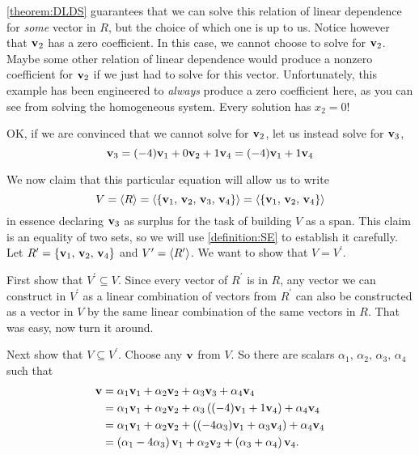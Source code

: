 \documentclass{ximera}
\begin{document}
\begin{example}
  \ref{theorem:DLDS} guarantees that we can solve this relation of
  linear dependence for \textit{some} vector in $R$, but the choice of
  which one is up to us.  Notice however that $\mathbf{v}_2$ has a zero
  coefficient.  In this case, we cannot choose to solve for
  $\mathbf{v}_2$.  Maybe some other relation of linear dependence would
  produce a nonzero coefficient for $\mathbf{v}_2$ if we just had to
  solve for this vector.  Unfortunately, this example has been
  engineered to \textit{always} produce a zero coefficient here, as
  you can see from solving the homogeneous system.  Every solution has
  $x_2=0$!

  OK, if we are convinced that we cannot solve for $\mathbf{v}_2$, let
  us instead solve for $\mathbf{v}_3$,
  \[
    \mathbf{v}_3=(-4)\mathbf{v}_1+0\mathbf{v}_2+1\mathbf{v}_4=(-4)\mathbf{v}_1+1\mathbf{v}_4
  \]
  
  We now claim that this particular equation will allow us to write
  \[
    V=\left\langle R\right\rangle=
    \left\langle\left\{\mathbf{v}_1,\,\mathbf{v}_2,\,\mathbf{v}_3,\,\mathbf{v}_4\right\}\right\rangle=
    \left\langle\left\{\mathbf{v}_1,\,\mathbf{v}_2,\,\mathbf{v}_4\right\}\right\rangle
  \]
  in essence declaring $\mathbf{v}_3$ as surplus for the task of
  building $V$ as a span.  This claim is an equality of two sets, so
  we will use \ref{definition:SE} to establish it carefully.  Let
  $R^\prime=\left\{\mathbf{v}_1,\,\mathbf{v}_2,\,\mathbf{v}_4\right\}$ and
  $V^\prime=\left\langle R^\prime\right\rangle$.  We want to show that $V=V^\prime$.

  First show that $V^\prime\subseteq V$.  Since every vector of
  $R^\prime$ is in $R$, any vector we can construct in $V^\prime$ as a
  linear combination of vectors from $R^\prime$ can also be
  constructed as a vector in $V$ by the same linear combination of the
  same vectors in $R$.  That was easy, now turn it around.
  
  Next show that $V\subseteq V^\prime$.  Choose any $\mathbf{v}$ from $V$.  So there are scalars $\alpha_1,\,\alpha_2,\,\alpha_3,\,\alpha_4$ such that
  \begin{align*}
    \mathbf{v}&=
              \alpha_1\mathbf{v}_1+\alpha_2\mathbf{v}_2+\alpha_3\mathbf{v}_3+\alpha_4\mathbf{v}_4\\
            &=\alpha_1\mathbf{v}_1+\alpha_2\mathbf{v}_2+
              \alpha_3\left((-4)\mathbf{v}_1+1\mathbf{v}_4\right)+
              \alpha_4\mathbf{v}_4\\
            &=\alpha_1\mathbf{v}_1+\alpha_2\mathbf{v}_2+
              \left((-4\alpha_3)\mathbf{v}_1+\alpha_3\mathbf{v}_4\right)+
              \alpha_4\mathbf{v}_4\\
            &=\left(\alpha_1-4\alpha_3\right)\mathbf{v}_1+
              \alpha_2\mathbf{v}_2+
              \left(\alpha_3+\alpha_4\right)\mathbf{v}_4.
  \end{align*}
  

\end{example}
\end{document}
